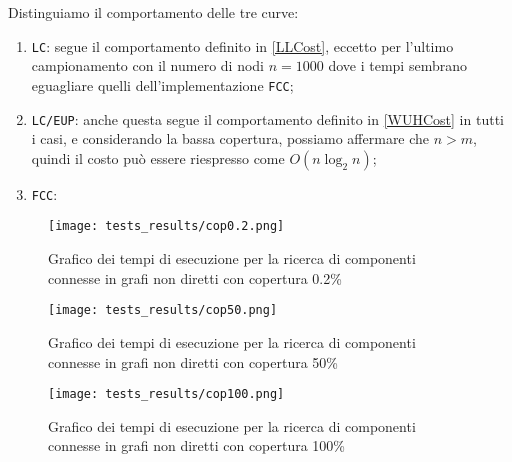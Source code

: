 Distinguiamo il comportamento delle tre curve:
\begin{enumerate}
    \item \texttt{LC}: segue il comportamento definito in \eqref{LLCost}, eccetto per l'ultimo campionamento con il numero di nodi
          $n=1000$ dove i tempi sembrano eguagliare quelli dell'implementazione \texttt{FCC};
    \item \texttt{LC/EUP}: anche questa segue il comportamento definito in \eqref{WUHCost} in tutti i casi, e considerando la bassa
          copertura, possiamo affermare che $n > m$, quindi il costo può essere riespresso come $O(n\log_2n)$;
    \item \texttt{FCC}: 
\end{enumerate}

\begin{figure}
    \centering
    \captionsetup{justification=centering}
    \texttt{[image: tests\_results/cop0.2.png]}
    \caption{Grafico dei tempi di esecuzione per la ricerca di componenti connesse in grafi non diretti con copertura 0.2\%}
\end{figure}


\begin{figure}
    \centering
    \captionsetup{justification=centering}
    \texttt{[image: tests\_results/cop50.png]}
    \caption{Grafico dei tempi di esecuzione per la ricerca di componenti connesse in grafi non diretti con copertura 50\%}
\end{figure}


\begin{figure}
    \centering
    \captionsetup{justification=centering}
    \texttt{[image: tests\_results/cop100.png]}
    \caption{Grafico dei tempi di esecuzione per la ricerca di componenti connesse in grafi non diretti con copertura 100\%}
\end{figure}
